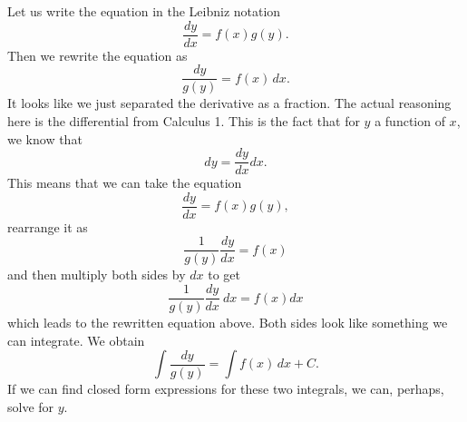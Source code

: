 \documentclass{ximera}
\begin{document}
Let us write the equation in the Leibniz notation
\begin{equation*}
    \frac{dy}{dx} = f(x)g(y) .
\end{equation*}
Then we rewrite the equation as
\begin{equation*}
    \frac{dy}{g(y)} = f(x) \,dx .
\end{equation*}
It looks like we just separated the derivative as a fraction. The actual reasoning here is the differential from Calculus 1. This is the fact that for $y$ a function of $x$, we know that 
\begin{equation*}
    dy = \frac{dy}{dx} dx.
\end{equation*}
This means that we can take the equation 
\begin{equation*}
    \frac{dy}{dx} = f(x)g(y),
\end{equation*}
rearrange it as 
\begin{equation*}
    \frac{1}{g(y)} \frac{dy}{dx} = f(x)
\end{equation*}
and then multiply both sides by $dx$ to get 
\begin{equation*}
    \frac{1}{g(y)} \frac{dy}{dx}\ dx = f(x) dx
\end{equation*} which leads to the rewritten equation above. 
Both sides look like something we can integrate.  We obtain
\begin{equation*}
    \int \frac{dy}{g(y)} = \int f(x) \,dx + C .
\end{equation*}
If we can find closed form expressions for these two integrals, we can, perhaps, solve for $y$.
\end{document}
